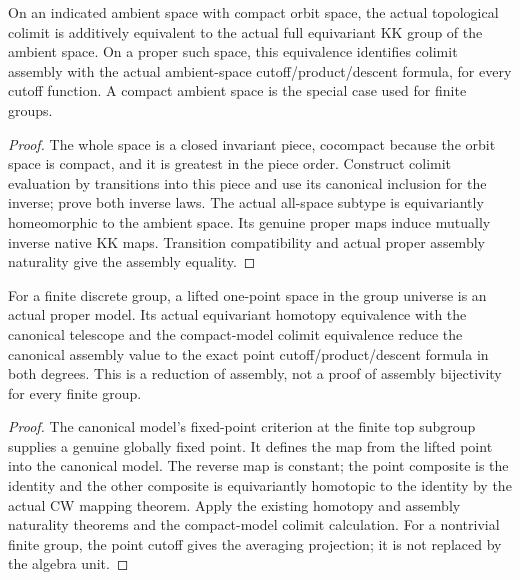 \begin{proposition}\label{prop:compact-model-colimit-calibration}
\leanok
On an indicated ambient space with compact orbit space, the actual
topological colimit is additively equivalent to the actual full equivariant
KK group of the ambient space. On a proper such space, this equivalence
identifies colimit assembly with the actual ambient-space
cutoff/product/descent formula, for every cutoff function. A compact ambient
space is the special case used for finite groups.
\end{proposition}
\begin{proof}
\leanok
The whole space is a closed invariant piece, cocompact because the orbit space
is compact, and it is greatest in the piece order. Construct colimit evaluation by transitions into this
piece and use its canonical inclusion for the inverse; prove both inverse
laws. The actual all-space subtype is equivariantly homeomorphic to the
ambient space. Its genuine proper maps induce mutually inverse native KK
maps. Transition compatibility and actual proper assembly naturality give
the assembly equality.
\end{proof}

\begin{proposition}\label{prop:finite-group-point-reduction}
\leanok
For a finite discrete group, a lifted one-point space in the group universe
is an actual proper model. Its actual equivariant homotopy equivalence with
the canonical telescope and the compact-model colimit equivalence reduce
the canonical assembly value to the exact point cutoff/product/descent
formula in both degrees. This is a reduction of assembly, not a proof of
assembly bijectivity for every finite group.
\end{proposition}
\begin{proof}
\leanok
The canonical model's fixed-point criterion at the finite top subgroup
supplies a genuine globally fixed point. It defines the map from the lifted
point into the canonical model. The reverse map is constant; the point
composite is the identity and the other composite is equivariantly homotopic
to the identity by the actual CW mapping theorem. Apply the existing
homotopy and assembly naturality theorems and the compact-model colimit
calculation. For a nontrivial finite group, the point cutoff gives the
averaging projection; it is not replaced by the algebra unit.
\end{proof}

